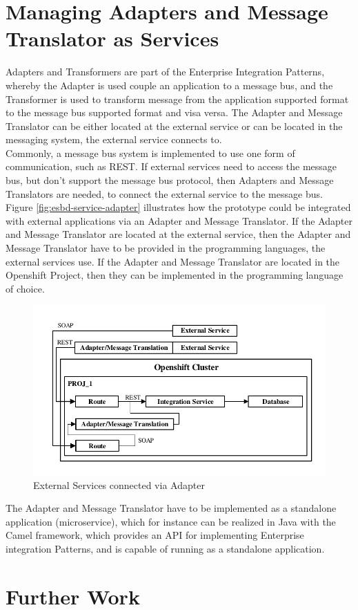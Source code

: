 \section{Managing Adapters and Message Translator as Services}
\label{sec:esbd-adap-trans-service}
Adapters and Transformers are part of the Enterprise Integration Patterns, whereby the Adapter is used couple an application to a message bus, and the Transformer is used to transform message from the application supported format to the message bus supported format and visa versa. The Adapter and Message Translator can be either located at the external service or can be located in the messaging system, the external service connects to. \\

Commonly, a message bus system is implemented to use one form of communication, such as REST. If external services need to access the message bus, but don't support the message bus protocol, then Adapters and Message Translators are needed, to connect the external service to the message bus. \\

Figure \vref{fig:esbd-service-adapter} illustrates how the prototype could be integrated with external applications via an Adapter and Message Translator. If the Adapter and Message Translator are located at the external service, then the Adapter and Message Translator have to be provided in the programming languages, the external services use. If the Adapter and Message Translator are located in the Openshift Project, then they can be implemented in the programming language of choice.

\begin{figure}[htbp]
	\centering
	\includegraphics[scale=1]{images/esbd-service-adapter.pdf}
	\caption{External Services connected via Adapter}
	\label{fig:esbd-service-adapter}
\end{figure}

The Adapter and Message Translator have to be implemented as a standalone application (microservice), which for instance can be realized in Java with the Camel framework, which provides an API for implementing Enterprise integration Patterns, and is capable of running as a standalone application. \\



\section{Further Work}
\label{sec:esbd-furhter-work}